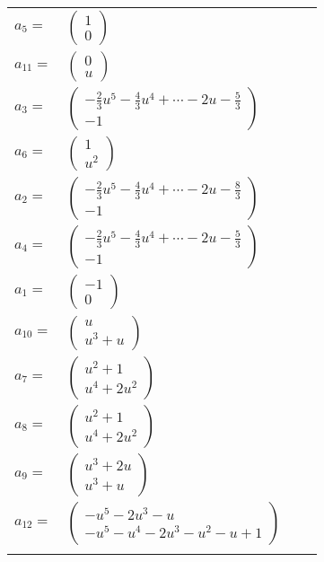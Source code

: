 \documentclass[1p]{elsarticle_modified}
\theoremstyle{definition}
\begin{document}
\begin{tabular}{m{7pt} m{180pt} m{7pt} m{180pt} }
\flushright $a_{5}=$&$\begin{pmatrix}1\\0\end{pmatrix}$ \\
\flushright $a_{11}=$&$\begin{pmatrix}0\\u\end{pmatrix}$ \\
\flushright $a_{3}=$&$\begin{pmatrix}-\frac{2}{3} u^5-\frac{4}{3} u^4+\cdots-2 u-\frac{5}{3}\\-1\end{pmatrix}$ \\
\flushright $a_{6}=$&$\begin{pmatrix}1\\u^2\end{pmatrix}$ \\
\flushright $a_{2}=$&$\begin{pmatrix}-\frac{2}{3} u^5-\frac{4}{3} u^4+\cdots-2 u-\frac{8}{3}\\-1\end{pmatrix}$ \\
\flushright $a_{4}=$&$\begin{pmatrix}-\frac{2}{3} u^5-\frac{4}{3} u^4+\cdots-2 u-\frac{5}{3}\\-1\end{pmatrix}$ \\
\flushright $a_{1}=$&$\begin{pmatrix}-1\\0\end{pmatrix}$ \\
\flushright $a_{10}=$&$\begin{pmatrix}u\\u^3+u\end{pmatrix}$ \\
\flushright $a_{7}=$&$\begin{pmatrix}u^2+1\\u^4+2 u^2\end{pmatrix}$ \\
\flushright $a_{8}=$&$\begin{pmatrix}u^2+1\\u^4+2 u^2\end{pmatrix}$ \\
\flushright $a_{9}=$&$\begin{pmatrix}u^3+2 u\\u^3+u\end{pmatrix}$ \\
\flushright $a_{12}=$&$\begin{pmatrix}- u^5-2 u^3- u\\- u^5- u^4-2 u^3- u^2- u+1\end{pmatrix}$\\&\end{tabular}
\end{document}
